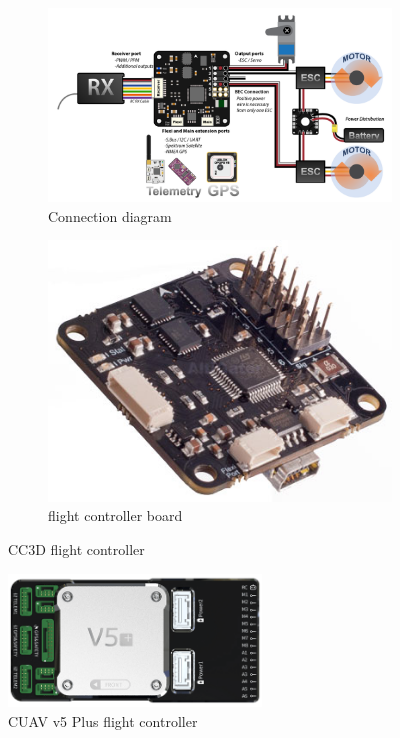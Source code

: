 \begin{figure}[htb!]
  \centering
  \begin{subfigure}[t]{0.8\textwidth}
  \includegraphics[width=1.0\textwidth]{./img/png/osh-cc3d-conn.png}
  \caption{Connection diagram}%
  \label{fig:osh-cc3d-conn}
  \end{subfigure}
%
  \begin{subfigure}[t]{0.35\textwidth}
  \includegraphics[width=1.0\textwidth]{./img/png/osh-cc3d-board.png}
  \caption{flight controller board}%
  \label{fig:osh-cc3d-board}
\end{subfigure}
%
  \caption{CC3D flight controller~\cite{cc3d}}%
  \label{fig:osh-cc3d}
\end{figure}
%

\begin{figure}[!hbt]
  \centering
  \includegraphics[width=0.6\textwidth]{./img/png/osh-cuav-v5.png} 
  \caption{CUAV v5 Plus flight controller~\cite{arduPilot-cuavV5}}%
  \label{fig:osh-cuav-v5}
\end{figure}


